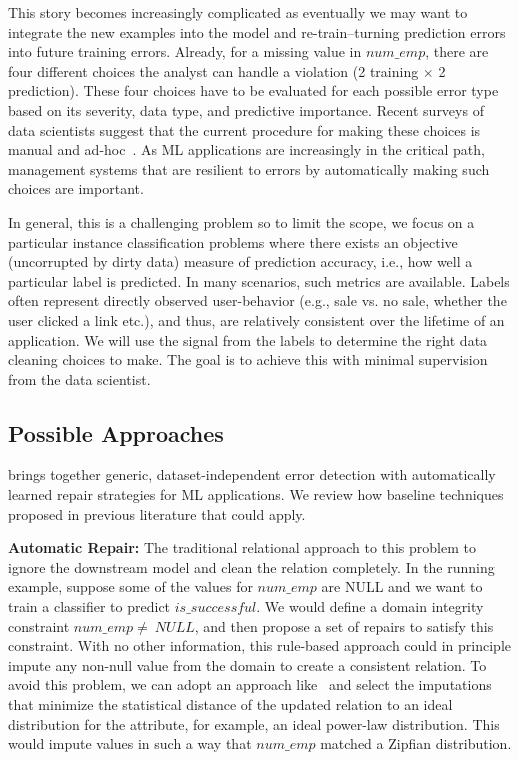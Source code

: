 \vspace{0.5em}

This story becomes increasingly complicated as eventually we may want to integrate the new examples into the model and re-train--turning prediction errors into future training errors.
Already, for a missing value in $num\_emp$, there are four different choices the analyst can handle a violation (2 training $\times$ 2 prediction).
These four choices have to be evaluated for each possible error type based on its severity, data type, and predictive importance.
Recent surveys of data scientists suggest that the current procedure for making these choices is manual and ad-hoc~\cite{kandel2012, krishnan2016hilda}.
As ML applications are increasingly in the critical path, management systems that are resilient to errors by automatically making such choices are important.

In general, this is a challenging problem so to limit the scope, we focus on a particular instance classification problems where there exists an objective (uncorrupted by dirty data) measure of prediction accuracy, i.e., how well a particular label is predicted.
In many scenarios, such metrics are available.
Labels often represent directly observed user-behavior (e.g., sale vs. no sale, whether the user clicked a link etc.), and thus, are relatively consistent over the lifetime of an application.
We will use the signal from the labels to determine the right data cleaning choices to make.
The goal is to achieve this with minimal supervision from the data scientist.

\subsection{Possible Approaches}
\sys brings together generic, dataset-independent error detection with automatically learned repair strategies for ML applications.
We review how baseline techniques proposed in previous literature that could apply.


\vspace{0.5em}

\noindent\textbf{Automatic Repair: } 
The traditional relational approach to this problem to ignore the downstream model and clean the relation completely.
In the running example, suppose some of the values for $num\_emp$ are NULL and we want to train a classifier to predict $is\_successful$.
We would define a domain integrity constraint $num\_emp \ne~NULL$, and then propose a set of repairs to satisfy this constraint.
With no other information, this rule-based approach could in principle impute any non-null value from the domain to create a consistent relation.
To avoid this problem, we can adopt an approach like~\cite{prokoshyna2015combining} and select the imputations that minimize the statistical distance of the updated relation to an ideal distribution for the attribute, for example, an ideal power-law distribution.
This would impute values in such a way that $num\_emp$ matched a Zipfian distribution.

